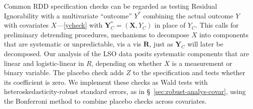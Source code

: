 Common RDD specification checks
can be regarded as testing Residual Ignorability with a multivariate
``outcome'' $Y^{*}$ combining the actual outcome $Y$ with covariates $X$---\eqref{ycheck} with
$\mathbf{Y}_{C}^{*} = (\mathbf{X}, {Y}_C)$ in place of $Y_{C}$.
%
This calls for preliminary detrending procedures, mechanisms to
decompose  $X$ into components that are systematic or unpredictable,
vis a vis $\mathbf{R}$, just as ${\mathbf{Y}_C}$ will later be decomposed.
Our analysis of the LSO data posits systematic components that are
linear and logistic-linear in $R$, depending on whether $X$ is
a measurement or binary variable. %
The placebo check adds $Z$ to the specification and tests whether its
coefficient is zero.  We implement these checks as Wald tests with
heteroskedasticity-robust standard errors, as in
\S~\ref{sec:robust-analys-covar}, using the Bonferroni method to
combine placebo checks across covariates.

